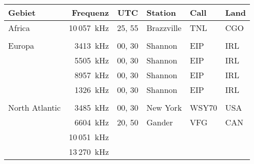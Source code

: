 \vspace{1em}
\begin{tabular}{lrclll}
\bfseries Gebiet & \bfseries Frequenz & \bfseries UTC & \bfseries Station & \bfseries Call & \bfseries Land \\ \toprule \arrayrulecolor{rowsep}
Africa & 10 057 kHz & 25, 55 & Brazzville & TNL & CGO \\ \midrule
 &  &  &  &  &  \\ \midrule
Europa & 3413 kHz & 00, 30 & Shannon & EIP & IRL \\ \midrule
 & 5505 kHz & 00, 30 & Shannon & EIP & IRL \\ \midrule
 & 8957 kHz & 00, 30 & Shannon & EIP & IRL \\ \midrule
 & 1326 kHz & 00, 30 & Shannon & EIP & IRL \\ \midrule
 &  &  &  &  &  \\ \midrule
North Atlantic & 3485 kHz & 00, 30 & New York & WSY70 & USA \\ \midrule
 & 6604 kHz & 20, 50 & Gander & VFG & CAN \\ \midrule
 & 10 051 kHz &  &  &  &  \\ \midrule
 & 13 270 kHz &  &  &  &  \\ \midrule
\end{tabular}










